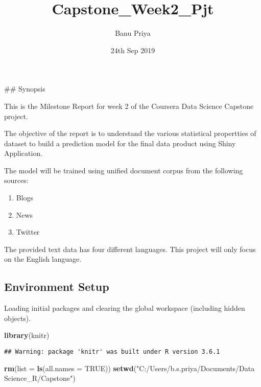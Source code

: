 \documentclass[]{article}
\title{Capstone\_Week2\_Pjt}
\author{Banu Priya}
\date{24th Sep 2019}
\newenvironment{Shaded}{\begin{snugshade}}{\end{snugshade}}
\newcommand{\DataTypeTok}[1]{\textcolor[rgb]{0.13,0.29,0.53}{#1}}
\newcommand{\KeywordTok}[1]{\textcolor[rgb]{0.13,0.29,0.53}{\textbf{#1}}}
\newcommand{\NormalTok}[1]{#1}
\newcommand{\OtherTok}[1]{\textcolor[rgb]{0.56,0.35,0.01}{#1}}
\newcommand{\StringTok}[1]{\textcolor[rgb]{0.31,0.60,0.02}{#1}}
\providecommand{\tightlist}{%
  \setlength{\itemsep}{0pt}\setlength{\parskip}{0pt}}
\begin{document}
\maketitle

\#\# Synopsis

This is the Milestone Report for week 2 of the Coursera Data Science
Capstone project.

The objective of the report is to understand the various statistical
propertties of dataset to build a prediction model for the final data
product using Shiny Application.

The model will be trained using unified document corpus from the
following sources:

\begin{enumerate}
\def\labelenumi{\alph{enumi}.}
\tightlist
\item
  Blogs
\item
  News
\item
  Twitter
\end{enumerate}

The provided text data has four different languages. This project will
only focus on the English language.

\hypertarget{environment-setup}{%
\subsection{Environment Setup}\label{environment-setup}}

Loading initial packages and clearing the global workspace (including
hidden objects).

\begin{Shaded}
\begin{Highlighting}[]
\KeywordTok{library}\NormalTok{(knitr)}
\end{Highlighting}
\end{Shaded}

\begin{verbatim}
## Warning: package 'knitr' was built under R version 3.6.1
\end{verbatim}

\begin{Shaded}
\begin{Highlighting}[]
\KeywordTok{rm}\NormalTok{(}\DataTypeTok{list =} \KeywordTok{ls}\NormalTok{(}\DataTypeTok{all.names =} \OtherTok{TRUE}\NormalTok{))}
\KeywordTok{setwd}\NormalTok{(}\StringTok{"C:/Users/b.s.priya/Documents/Data Science_R/Capstone"}\NormalTok{)}
\end{Highlighting}
\end{Shaded}
\end{document}

